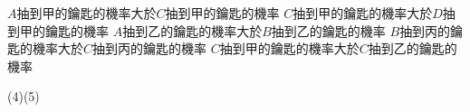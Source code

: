 \begin{QUESTIONS}
\begin{QUESTION}
\begin{QBODY}
			\begin{QOPS}
				\QOP $A$抽到甲的鑰匙的機率大於$C$抽到甲的鑰匙的機率
				\QOP $C$抽到甲的鑰匙的機率大於$D$抽到甲的鑰匙的機率
				\QOP $A$抽到乙的鑰匙的機率大於$B$抽到乙的鑰匙的機率
				\QOP $B$抽到丙的鑰匙的機率大於$C$抽到丙的鑰匙的機率
				\QOP $C$抽到甲的鑰匙的機率大於$C$抽到乙的鑰匙的機率
			\end{QOPS}
        \end{QBODY}
        \begin{QFROMS}
        \end{QFROMS}
        \begin{QTAGS}\end{QTAGS}
        \begin{QANS}
            (4)(5)
        \end{QANS}
        \begin{QSOLLIST}
        \end{QSOLLIST}
        \begin{QEMPTYSPACE}
        \end{QEMPTYSPACE}
    \end{QUESTION}
\end{QUESTIONS}
